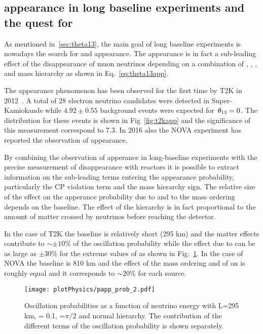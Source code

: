 \subsection{\nue appearance in long baseline experiments and the quest for \dcp}
As mentioned in~\ref{sec:theta13}, the main goal of long baseline experiments is nowadays the search for \nue and \nueb appearance. The \nue appearance is in fact a sub-leading effect of the disappearance of muon neutrinos depending on a combination of \thint, \thatm, \dcp, and mass hierarchy as shown in Eq.~\ref{eq:theta13app}.

The \nue appearance phenomenon has been observed for the first time by T2K in 2012~\cite{Abe:2013hdq}. A total of 28 electron neutrino candidates were detected in Super-Kamiokande while $4.92\pm0.55$ background events were expected for $\textrm \,\theta_{13}=0$. The \ptheta distribution for these events is shown in Fig~\ref{fig:t2kapp} and the significance of this measurement correspond to 7.3\sigma. In 2016 also the NOVA experiment has reported the observation of \nue appearance.

By combining the observation of \nue apperance in long-baseline experiments with the precise measurement of \nueb disappearance with reactors it is possible to extract information on the sub-leading terms entering the appearance probability, particularly the CP violation term \dcp and the mass hierarchy sign. 
The relative size of the effect on the apperance probability due to \dcp and to the mass ordering depends on the baseline. The effect of the hierarchy is in fact proportional to the amount of matter crossed by neutrinos before reaching the detector. 

In the case of T2K the baseline is relatively short (295 km) and the matter effects contribute to $\sim\pm10\%$ of the oscillation probability while the effect due to \dcp can be as large as $\pm30\%$ for the extreme values of \dcp as shown in Fig.~\ref{fig:t2kappprob}. In the case of NOVA the baseline is 810 km and the effect of the mass ordering and of \dcp on \papp is roughly equal and it corresponds to $\sim20\%$ for each source.

\begin{figure} [h!]
\begin{center}
\texttt{[image: plotPhysics/papp\_prob\_2.pdf]}
\caption{\label{fig:t2kappprob} Oscillation probabilities as a function of neutrino energy with L=295 km, \stot = 0.1, \dcp=$\pi/2$ and normal hierarchy. The contribution of the different terms of the oscillation probability is shown separately.}
\end{center}
\end{figure}

